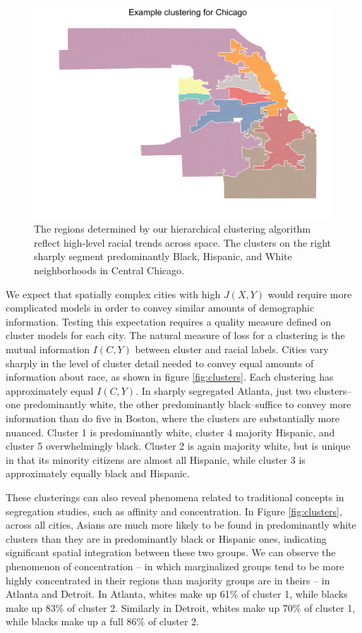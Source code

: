 		\begin{figure}
			\centering
			\includegraphics[width=\textwidth]{figs/example_cluster_map.png}
			\caption{The regions determined by our hierarchical clustering algorithm reflect high-level racial trends across space. The clusters on the right sharply segment predominantly Black, Hispanic, and White neighborhoods in Central Chicago.}
			\label{fig:cluster_map}
		\end{figure}		

		We expect that spatially complex cities with high $J(X,Y)$ would require more complicated models in order to convey similar amounts of demographic information. Testing this expectation requires a quality measure defined on cluster models for each city. The natural measure of loss for a clustering is the mutual information $I(C,Y)$ between cluster and racial labels. Cities vary sharply in the level of cluster detail needed to convey equal amounts of information about race, as shown in figure \ref{fig:clusters}. Each clustering has approximately equal $I(C,Y)$. In sharply segregated Atlanta, just two clusters--one predominantly white, the other predominantly black--suffice to convey more information than do five in Boston, where the clusters are substantially more nuanced. Cluster 1 is predominantly white, cluster 4 majority Hispanic, and cluster 5 overwhelmingly black. Cluster 2 is again majority white, but is unique in that its minority citizens are almost all Hispanic, while cluster 3 is approximately equally black and Hispanic. 

		These clusterings can also reveal phenomena related to traditional concepts in segregation studies, such as affinity and concentration. In Figure \ref{fig:clusters}, across all cities, Asians are much more likely to be found in predominantly white clusters than they are in predominantly black or Hispanic ones, indicating significant spatial integration between these two groups. We can observe the phenomenon of concentration -- in which marginalized groups tend to be more highly concentrated in their regions than majority groups are in theirs -- in Atlanta and Detroit. In Atlanta, whites make up 61\% of cluster 1, while blacks make up 83\% of cluster 2. Similarly in Detroit, whites make up 70\% of cluster 1, while blacks make up a full 86\% of cluster 2. 

